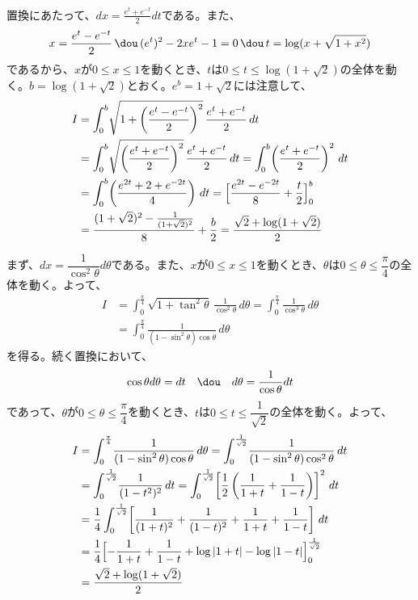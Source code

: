 置換にあたって、$dx = \frac{e^t+e^{-t}}{2} dt$である。また、
\[ x=\frac{e^t-e^{-t}}{2} \,\dou\, (e^t)^2-2xe^t-1=0 \,\dou\, t=\log (x+\sqrt{1+x^2}) \]
であるから、$x$が$0\le x\le 1$を動くとき、$t$は$0\le t\le \log(1+\sqrt{2})$の全体を動く。$b=\log(1+\sqrt{2})$とおく。$e^b=1+\sqrt{2}$には注意して、
\begin{align*}
 I&=\int_0^b\! \sqrt{1+\left(\frac{e^t-e^{-t}}{2}\right)^2} \,\frac{e^t+e^{-t}}{2} \,dt \\
 &=\int_0^b\! \sqrt{\left(\frac{e^t+e^{-t}}{2}\right)^2} \,\frac{e^t+e^{-t}}{2} \,dt =\int_0^b\!\left(\frac{e^t+e^{-t}}{2}\right)^2 \,dt \\
 &=\int_0^b\!\left(\frac{e^{2t}+2+e^{-2t}}{4}\right) \,dt = \Bigl[\frac{e^{2t}-e^{-2t}}{8}+\frac{t}{2}\Bigr]_0^b \\
 &=\frac{(1+\sqrt{2})^2-\frac{1}{(1+\sqrt{2})^2}}{8}+\frac{b}{2} = \frac{\sqrt{2}+\log(1+\sqrt{2})}{2}
\end{align*}

まず、$dx=\dfrac{1}{\cos^2\theta}d\theta$である。また、$x$が$0\le x\le 1$を動くとき、$\theta$は$0\le\theta\le\dfrac{\pi}{4}$の全体を動く。よって、
\begin{align*}
 I&=\int_0^{\frac{\pi}{4}}\! \sqrt{1+\tan^2\theta} \,\frac{1}{\cos^2\theta} \,d\theta = \int_0^{\frac{\pi}{4}}\! \frac{1}{\cos^3\theta}\, d\theta \\
 &=\int_0^{\frac{\pi}{4}}\! \frac{1}{(1-\sin^2\theta)\cos\theta} \,d\theta
\end{align*}
を得る。続く置換において、
\[ \cos\theta d\theta = dt \quad\dou\quad d\theta=\frac{1}{\cos\theta} dt \]
であって、$\theta$が$0\le\theta\le\dfrac{\pi}{4}$を動くとき、$t$は$0\le t\le \dfrac{1}{\sqrt{2}}$の全体を動く。よって、
\begin{align*}
 I&= \int_0^{\frac{\pi}{4}}\! \frac{1}{(1-\sin^2\theta)\cos\theta} \,d\theta = \int_0^{\frac{1}{\sqrt{2}}}\! \frac{1}{(1-\sin^2\theta)\cos^2\theta} \,dt \\
 &=\int_0^{\frac{1}{\sqrt{2}}}\! \frac{1}{(1-t^2)^2} \,dt = \int_0^{\frac{1}{\sqrt{2}}}\! \left[\frac{1}{2}\left(\frac{1}{1+t}+\frac{1}{1-t}\right)\right]^2 \,dt \\
 &= \frac{1}{4}\int_0^{\frac{1}{\sqrt{2}}}\! \left[\frac{1}{(1+t)^2}+\frac{1}{(1-t)^2}+\frac{1}{1+t}+\frac{1}{1-t}\right] \,dt \\
 &= \frac{1}{4}\Bigl[-\frac{1}{1+t}+\frac{1}{1-t}+\log|1+t|-\log|1-t|\Bigr]_0^{\frac{1}{\sqrt{2}}} \\
 &= \frac{\sqrt{2}+\log(1+\sqrt{2})}{2}
\end{align*}


